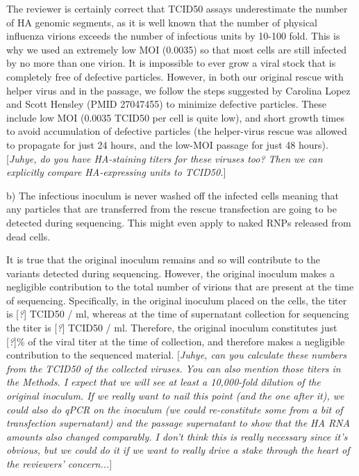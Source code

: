 \documentclass[11pt, oneside]{article}   	%
\newcommand{\comment}[1]{{\color{red}[\textsl{#1}]}}
\newcommand{\response}[1]{{\color{black}#1}}
\begin{document}
\response{The reviewer is certainly correct that TCID50 assays underestimate the number of HA genomic segments, as it is well known that the number of physical influenza virions exceeds the number of infectious units by 10-100 fold.
This is why we used an extremely low MOI (0.0035) so that most cells are still infected by no more than one virion.
It is impossible to ever grow a viral stock that is completely free of defective particles.
However, in both our original rescue with helper virus and in the passage, we follow the steps suggested by Carolina Lopez and Scott Hensley (PMID 27047455) to minimize defective particles.
These include low MOI (0.0035 TCID50 per cell is quite low), and short growth times to avoid accumulation of defective particles (the helper-virus rescue was allowed to propagate for just 24 hours, and the low-MOI passage for just 48 hours).
\comment{Juhye, do you have HA-staining titers for these viruses too? Then we can explicitly compare HA-expressing units to TCID50.}
}

b) The infectious inoculum is never washed off the infected cells meaning that any particles that are transferred from the rescue transfection are going to be detected during sequencing. This might even apply to naked RNPs released from dead cells. 

\response{It is true that the original inoculum remains and so will contribute to the variants detected during sequencing.
However, the original inoculum makes a negligible contribution to the total number of virions that are present at the time of sequencing.
Specifically, in the original inoculum placed on the cells, the titer is \comment{?} TCID50 / ml, whereas at the time of supernatant collection for sequencing the titer is \comment{?} TCID50 / ml.
Therefore, the original inoculum constitutes just \comment{?}\% of the viral titer at the time of collection, and therefore makes a negligible contribution to the sequenced material.
\comment{Juhye, can you calculate these numbers from the TCID50 of the collected viruses. 
You can also mention those titers in the Methods.
I expect that we will see at least a 10,000-fold dilution of the original inoculum.
If we really want to nail this point (and the one after it), we could also do qPCR on the inoculum (we could re-constitute some from a bit of transfection supernatant) and the passage supernatant to show that the HA RNA amounts also changed comparably.
I don't think this is really necessary since it's obvious, but we could do it if we want to really drive a stake through the heart of the reviewers' concern...}
}
\end{document}
